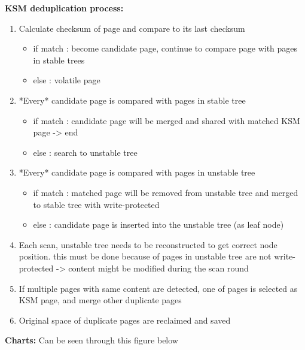 \textbf{KSM deduplication process:}
\begin{enumerate}
\item Calculate checksum of page and compare to its last checksum
  \begin{itemize}
  \item if match : become candidate page, continue to compare page with pages in stable trees
  \item else     : volatile page
  \end{itemize}
\item *Every* candidate page is compared with pages in stable tree
  \begin{itemize}
  \item if match : candidate page will be merged and shared with matched KSM page -> end
  \item else     : search to unstable tree
  \end{itemize}
\item *Every* candidate page is compared with pages in unstable tree
  \begin{itemize}
  \item if match : matched page will be removed from unstable tree and merged to stable tree with write-protected
  \item else     : candidate page is inserted into the unstable tree (as leaf node)
  \end{itemize}
\item Each scan, unstable tree needs to be reconstructed to get correct node position. this must be done because of pages in unstable tree are not write-protected -> content might be modified during the scan round
\item If multiple pages with same content are detected, one of pages is selected as KSM page, and merge other duplicate pages
\item Original space of duplicate pages are reclaimed and saved
\end{enumerate}

\textbf{Charts:}
Can be seen through this figure below

